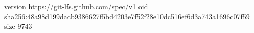version https://git-lfs.github.com/spec/v1
oid sha256:48a98d199dacb9386627f5bd4203e7f52f28e10dc516ef6d3a743a1696c07f59
size 9743
